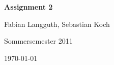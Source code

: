 



% 

\begin{center}
    \huge {\bf Assignment 2}
    
    \small Fabian Langguth, Sebastian Koch
    
    Sommersemester 2011
    
    \today
\end{center}
%


